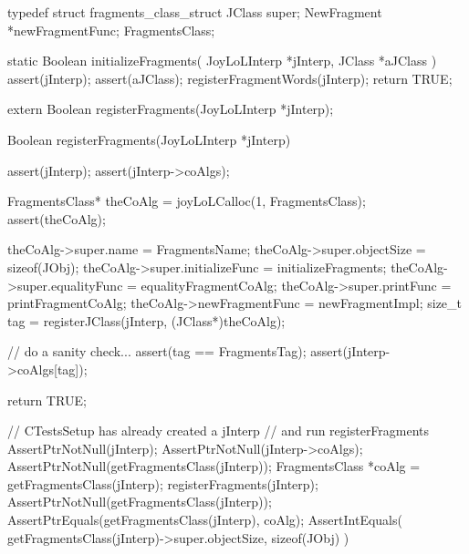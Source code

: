\startCHeader
typedef struct fragments_class_struct {
  JClass       super;
  NewFragment      *newFragmentFunc;
} FragmentsClass;

\stopCHeader

\startCCode
static Boolean initializeFragments(
  JoyLoLInterp *jInterp,
  JClass   *aJClass
) {
  assert(jInterp);
  assert(aJClass);
  registerFragmentWords(jInterp);
  return TRUE;
}
\stopCCode

\startCHeader
extern Boolean registerFragments(JoyLoLInterp *jInterp);
\stopCHeader
{}

\startCCode
Boolean registerFragments(JoyLoLInterp *jInterp) {
  assert(jInterp);
  assert(jInterp->coAlgs);
  
  FragmentsClass* theCoAlg
    = joyLoLCalloc(1, FragmentsClass);
  assert(theCoAlg);
  
  theCoAlg->super.name           = FragmentsName;
  theCoAlg->super.objectSize     = sizeof(JObj);
  theCoAlg->super.initializeFunc = initializeFragments;
  theCoAlg->super.equalityFunc   = equalityFragmentCoAlg;
  theCoAlg->super.printFunc      = printFragmentCoAlg;
  theCoAlg->newFragmentFunc = newFragmentImpl;
  size_t tag =
    registerJClass(jInterp, (JClass*)theCoAlg);
  
  // do a sanity check...
  assert(tag == FragmentsTag);
  assert(jInterp->coAlgs[tag]);
   
  return TRUE;
}
\stopCCode


\startCTest
  // CTestsSetup has already created a jInterp
  // and run registerFragments
  AssertPtrNotNull(jInterp);
  AssertPtrNotNull(jInterp->coAlgs);
  AssertPtrNotNull(getFragmentsClass(jInterp));
  FragmentsClass *coAlg = getFragmentsClass(jInterp);
  registerFragments(jInterp);
  AssertPtrNotNull(getFragmentsClass(jInterp));
  AssertPtrEquals(getFragmentsClass(jInterp), coAlg);
  AssertIntEquals(
    getFragmentsClass(jInterp)->super.objectSize,
    sizeof(JObj)
  )
\stopCTest
\stopTestCase
\stopTestSuite
